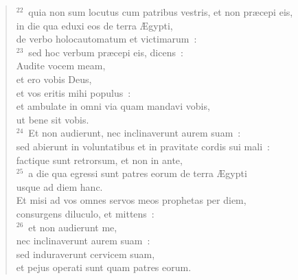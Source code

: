 \begin{verse}
${}^{22}$~quia non sum locutus cum patribus vestris, et non pr\ae cepi eis,\\ in die qua eduxi eos de terra \AE gypti,\\ de verbo holocautomatum et victimarum~:\\
${}^{23}$~sed hoc verbum pr\ae cepi eis, dicens~:\\ Audite vocem meam,\\ et ero vobis Deus,\\ et vos eritis mihi populus~:\\ et ambulate in omni via quam mandavi vobis,\\ ut bene sit vobis.\\
${}^{24}$~Et non audierunt, nec inclinaverunt aurem suam~:\\ sed abierunt in voluntatibus et in pravitate cordis sui mali~:\\ factique sunt retrorsum, et non in ante,\\
${}^{25}$~a die qua egressi sunt patres eorum de terra \AE gypti\\ usque ad diem hanc.\\ Et misi ad vos omnes servos meos prophetas per diem,\\ consurgens diluculo, et mittens~:\\
${}^{26}$~et non audierunt me,\\ nec inclinaverunt aurem suam~:\\ sed induraverunt cervicem suam,\\ et pejus operati sunt quam patres eorum.\end{verse}


